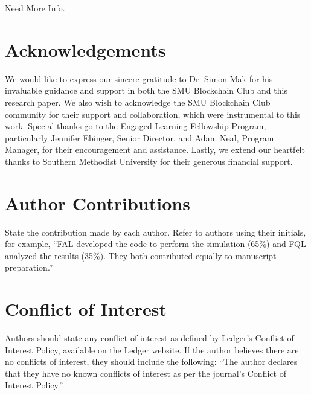 \documentclass{ledger}
\begin{document}
Need More Info.

\ledgernotes

\section*{Acknowledgements} 

We would like to express our sincere gratitude to Dr. Simon Mak for his invaluable guidance and support in both the SMU Blockchain Club and this research paper. We also wish to acknowledge the SMU Blockchain Club community for their support and collaboration, which were instrumental to this work. Special thanks go to the Engaged Learning Fellowship Program, particularly Jennifer Ebinger, Senior Director, and Adam Neal, Program Manager, for their encouragement and assistance. Lastly, we extend our heartfelt thanks to Southern Methodist University for their generous financial support.

\section*{Author Contributions}

State the contribution made by each author.  Refer to authors using their initials, for example, ``FAL developed the code to perform the simulation (65\%) and FQL analyzed the results (35\%).  They both contributed equally to manuscript preparation.''

\section*{Conflict of Interest}

Authors should state any conflict of interest as defined by Ledger's Conflict of Interest Policy, available on the Ledger website. If the author believes there are no conflicts of interest, they should include the following: ``The author declares that they have no known conflicts of interest as per the journal’s Conflict of Interest Policy.''





\end{document}
